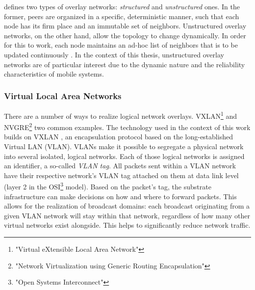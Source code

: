 \citeauthor*{tarkoma2010overlay} defines two types of overlay networks: \emph{structured} and \emph{unstructured} ones. In the former, peers are organized in a specific, deterministic manner, such that each node has its firm place and an immutable set of neighbors. Unstructured overlay networks, on the other hand, allow the topology to change dynamically. In order for this to work, each node maintains an ad-hoc list of neighbors that is to be updated continuously \cite{tanenbaum2017distributed}. In the context of this thesis, unstructured overlay networks are of particular interest due to the dynamic nature and the reliability characteristics of mobile systems. 

\subsubsection{Virtual Local Area Networks}
There are a number of ways to realize logical network overlays. VXLAN\footnote{"Virtual eXtensible Local Area Network"} and NVGRE\footnote{"Network Virtualization using Generic Routing Encapsulation"} two common examples. The technology used in the context of this work builds on VXLAN \cite{rfc7348}, an encapsulation protocol based on the long-established Virtual LAN (VLAN). VLANs make it possible to segregate a physical network into several isolated, logical networks. Each of those logical networks is assigned an identifier, a so-called \emph{VLAN tag}. All packets sent within a VLAN network have their respective network's VLAN tag attached on them at data link level (layer 2 in the OSI\footnote{"Open Systems Interconnect"} model). Based on the packet's tag, the substrate infrastructure can make decisions on how and where to forward packets. This allows for the realization of broadcast domains: each broadcast originating from a given VLAN network will stay within that network, regardless of how many other virtual networks exist alongside. This helps to significantly reduce network traffic.

